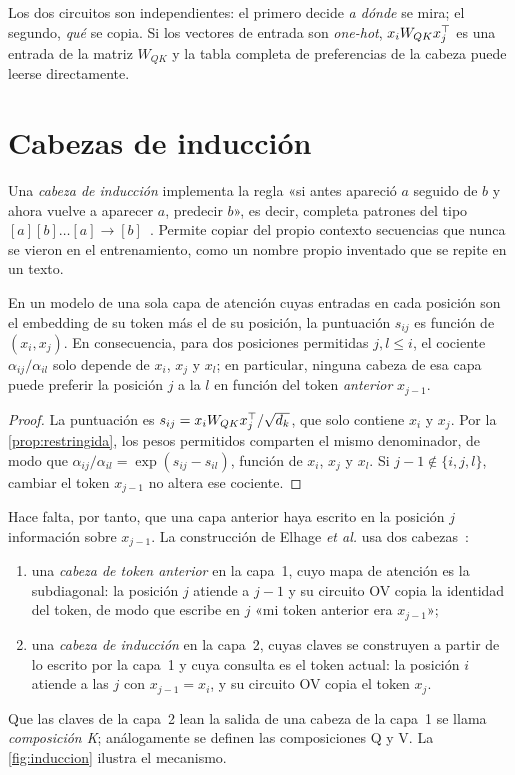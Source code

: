 Los dos circuitos son independientes: el primero decide \emph{a dónde} se mira; el segundo, \emph{qué} se copia. Si los vectores de entrada son \emph{one-hot}, $x_iW_{QK}x_j^{\top}$ es una entrada de la matriz $W_{QK}$ y la tabla completa de preferencias de la cabeza puede leerse directamente.

\section{Cabezas de inducción}

Una \emph{cabeza de inducción} implementa la regla «si antes apareció $a$ seguido de $b$ y ahora vuelve a aparecer $a$, predecir $b$», es decir, completa patrones del tipo $[a][b]\dots[a]\to[b]$~\cite{olsson}. Permite copiar del propio contexto secuencias que nunca se vieron en el entrenamiento, como un nombre propio inventado que se repite en un texto.

\begin{proposicion}\label{prop:una-capa}
En un modelo de una sola capa de atención cuyas entradas en cada posición son el embedding de su token más el de su posición, la puntuación $s_{ij}$ es función de $(x_i,x_j)$. En consecuencia, para dos posiciones permitidas $j,l\le i$, el cociente $\alpha_{ij}/\alpha_{il}$ solo depende de $x_i$, $x_j$ y $x_l$; en particular, ninguna cabeza de esa capa puede preferir la posición $j$ a la $l$ en función del token \emph{anterior} $x_{j-1}$.
\end{proposicion}

\begin{proof}
La puntuación es $s_{ij}=x_iW_{QK}x_j^{\top}/\sqrt{d_k}$, que solo contiene $x_i$ y $x_j$. Por la \cref{prop:restringida}, los pesos permitidos comparten el mismo denominador, de modo que $\alpha_{ij}/\alpha_{il}=\exp(s_{ij}-s_{il})$, función de $x_i$, $x_j$ y $x_l$. Si $j-1\notin\{i,j,l\}$, cambiar el token $x_{j-1}$ no altera ese cociente.
\end{proof}

Hace falta, por tanto, que una capa anterior haya escrito en la posición $j$ información sobre $x_{j-1}$. La construcción de Elhage \emph{et al.} usa dos cabezas~\cite{elhage}:
\begin{enumerate}[label=\arabic*.]
  \item una \emph{cabeza de token anterior} en la capa~1, cuyo mapa de atención es la subdiagonal: la posición $j$ atiende a $j-1$ y su circuito OV copia la identidad del token, de modo que escribe en $j$ «mi token anterior era $x_{j-1}$»;
  \item una \emph{cabeza de inducción} en la capa~2, cuyas claves se construyen a partir de lo escrito por la capa~1 y cuya consulta es el token actual: la posición $i$ atiende a las $j$ con $x_{j-1}=x_i$, y su circuito OV copia el token $x_j$.
\end{enumerate}
Que las claves de la capa~2 lean la salida de una cabeza de la capa~1 se llama \emph{composición K}; análogamente se definen las composiciones Q y V. La \cref{fig:induccion} ilustra el mecanismo.

